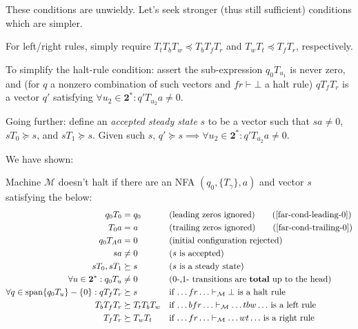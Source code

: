 These conditions are unwieldy. Let's seek stronger (thus still sufficient) conditions which are simpler.

For left/right rules, simply require $T_t T_b T_w\preceq T_b T_f T_r$ and $T_w T_t\preceq T_f T_r$, respectively.

To simplify the halt-rule condition:
assert the sub-expression $q_0 T_{u_1}$ is never zero,
and (for $q$ a nonzero combination of such vectors and $fr\vdash\bot$ a halt rule)
$q T_f T_r$ is a vector $q'$ satisfying $\forall u_2\in\mathbf{2}^*: q' T_{u_2} a\ne 0$.

Going further: define an \emph{accepted steady state} $s$ to be a vector such that $sa\ne 0$, $s T_0\succeq s$, and $s T_1\succeq s$.
Given such $s$, $q'\succeq s\implies \forall u_2\in\mathbf{2}^*: q'T_{u_2}a\ne 0$.

We have shown:

\begin{theorem}
  \label{far-main-theorem}
  Machine $\mathcal{M}$ doesn't halt if there are an NFA $(q_0, \{T_\gamma\}, a)$ and vector $s$ satisfying the below:
  \begin{align}
    \label{far-cond-first}
    q_0 T_0 &= q_0
    &&\text{(leading zeros ignored)}
    \tag{\ref{far-cond-leading-0}}
    \\
    T_0 a &= a
    &&\text{(trailing zeros ignored)}
    \tag{\ref{far-cond-trailing-0}}
    \\
    q_0 T_A a &= 0
    &&\text{(initial configuration rejected)}
    \label{far-cond-reject-start}
    \\
    sa &\ne 0
    &&\text{($s$ is accepted)}
    \label{far-cond-ass-accepted}
    \\
    sT_0,sT_1 &\succeq s
    &&\text{($s$ is a steady state)}
    \label{far-cond-ass-steady}
    \\
    \forall u\in\mathbf{2}^*: q_0 T_u &\ne 0
    &&\text{(0-,1- transitions are \textbf{total} up to the head)}
    \label{far-cond-total}
    \\
    \forall q\in\operatorname{span}\{q_0T_u\}-\{0\}: q T_f T_r &\succeq s
    &&\text{if $\ldots fr\ldots\vdash_\mathcal{M}\bot$ is a halt rule}
    \label{far-cond-halt}
    \\
    T_b T_f T_r &\succeq T_t T_b T_w
    &&\text{if $\ldots bfr\ldots\vdash_\mathcal{M}\ldots tbw\ldots$ is a left rule}
    \label{far-cond-left}
    \\
    T_f T_r &\succeq T_w T_t
    &&\text{if $\ldots fr\ldots\vdash_\mathcal{M}\ldots wt\ldots$ is a right rule}
    \label{far-cond-last}
  \end{align}
\end{theorem}


